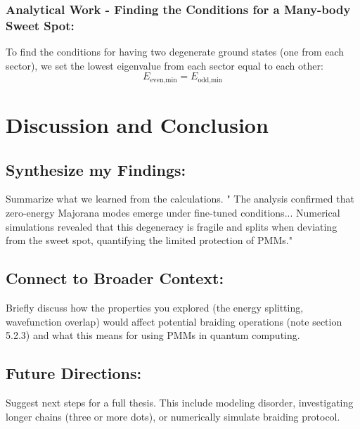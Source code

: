 \documentclass[11pt, letterpaper, titlepage]{article}
\begin{document}
\subsubsection{Analytical Work - Finding the Conditions for a Many-body Sweet Spot:}
To find the conditions for having two degenerate ground states (one from each sector), we set the lowest eigenvalue from each sector equal to each other:
$$E_{\text{even,min}} = E_{\text{odd,min}}$$


\section{Discussion and Conclusion}
\subsection{Synthesize my Findings:} Summarize what we learned from the calculations. " The analysis confirmed that zero-energy Majorana modes emerge under fine-tuned conditions... Numerical simulations revealed that this degeneracy is fragile and splits when deviating from the sweet spot, quantifying the limited protection of PMMs."\par
\subsection{Connect to Broader Context:} Briefly discuss how the properties you explored (the energy splitting, wavefunction overlap) would affect potential braiding operations (note section 5.2.3) and what this means for using PMMs in quantum computing.\par
\subsection{Future Directions:} Suggest next steps for a full thesis. This include modeling disorder, investigating longer chains (three or more dots), or numerically simulate braiding protocol.
\end{document}
